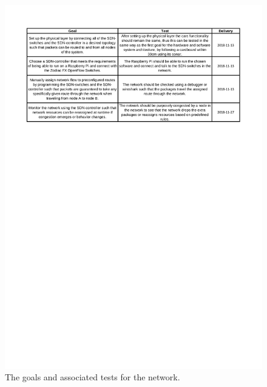 \documentclass[11pt, titlepage]{article} %
\begin{document}
\begin{figure}
    \centering
    \includegraphics[scale=0.6]{goals_nw.pdf}
    \caption{The goals and associated tests for the network.}
    \label{fig:goals_nw}
\end{figure}
\end{document}
